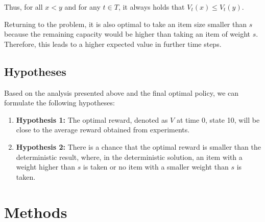 Thus, for all $x < y$ and for any $t \in T$, it always holds that $V_t(x) \leq V_t(y)$.

Returning to the problem, it is also optimal to take an item size smaller than $s$ because the remaining capacity would be higher than taking an item of weight $s$. Therefore, this leads to a higher expected value in further time steps.

\subsection{Hypotheses}

Based on the analysis presented above and the final optimal policy, we can formulate the following hypotheses:

\begin{enumerate}[label=(\roman*)]
    \item \textbf{Hypothesis 1:} The optimal reward, denoted as $V$ at time 0, state 10, will be close to the average reward obtained from experiments.
    \item \textbf{Hypothesis 2:} There is a chance that the optimal reward is smaller than the deterministic result, where, in the deterministic solution, an item with a weight higher than $s$ is taken or no item with a smaller weight than $s$ is taken.
\end{enumerate}

\section{Methods}

